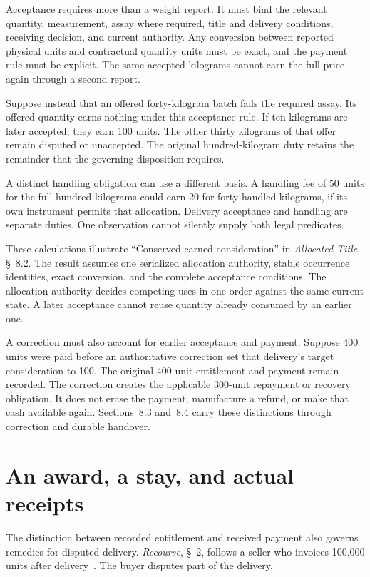 \documentclass{momentum}
\begin{document}
Acceptance requires more than a weight report. It must bind the relevant quantity, measurement, assay where required, title and delivery conditions, receiving decision, and current authority. Any conversion between reported physical units and contractual quantity units must be exact, and the payment rule must be explicit. The same accepted kilograms cannot earn the full price again through a second report.

Suppose instead that an offered forty-kilogram batch fails the required assay. Its offered quantity earns nothing under this acceptance rule. If ten kilograms are later accepted, they earn 100 units. The other thirty kilograms of that offer remain disputed or unaccepted. The original hundred-kilogram duty retains the remainder that the governing disposition requires.

A distinct handling obligation can use a different basis. A handling fee of 50 units for the full hundred kilograms could earn 20 for forty handled kilograms, if its own instrument permits that allocation. Delivery acceptance and handling are separate duties. One observation cannot silently supply both legal predicates.

These calculations illustrate ``Conserved earned consideration'' in \emph{Allocated Title}, \S~8.2. The result assumes one serialized allocation authority, stable occurrence identities, exact conversion, and the complete acceptance conditions. The allocation authority decides competing uses in one order against the same current state. A later acceptance cannot reuse quantity already consumed by an earlier one.

A correction must also account for earlier acceptance and payment. Suppose 400 units were paid before an authoritative correction set that delivery's target consideration to 100. The original 400-unit entitlement and payment remain recorded. The correction creates the applicable 300-unit repayment or recovery obligation. It does not erase the payment, manufacture a refund, or make that cash available again. Sections~8.3 and~8.4 carry these distinctions through correction and durable handover.

\section{An award, a stay, and actual receipts}

The distinction between recorded entitlement and received payment also governs remedies for disputed delivery. \emph{Recourse}, \S~2, follows a seller who invoices 100,000 units after delivery~\cite{recourse}. The buyer disputes part of the delivery.
\end{document}
